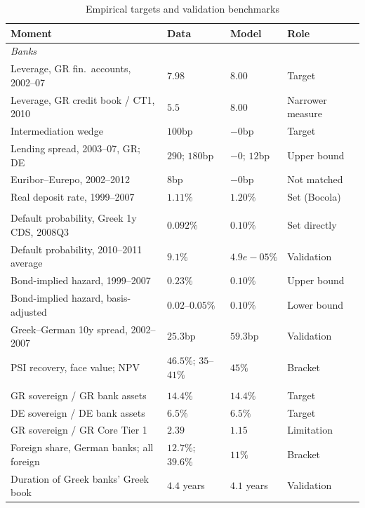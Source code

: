 \begin{table}[H]
  \centering
  \caption{Empirical targets and validation benchmarks}
  \label{tab:targets}
  \footnotesize{}
  \begin{tabular}{llll}
    \toprule
    Moment & Data & Model & Role \\
    \midrule
    \multicolumn{4}{l}{\emph{Banks}} \\
    Leverage, GR fin.\ accounts, 2002--07 & $7.98$ & $8.00$ & Target \\
    Leverage, GR credit book / CT1, 2010 & $5.5$ & $8.00$ & Narrower measure \\
    Intermediation wedge & $100$bp & $-0$bp & Target \\
    Lending spread, 2003--07, GR; DE & $290$; $180$bp & $-0$; $12$bp & Upper bound \\
    Euribor--Eurepo, 2002--2012 & $8$bp & $-0$bp & Not matched \\
    Real deposit rate, 1999--2007 & $1.11\%$ & $1.20\%$ & Set (Bocola) \\
    \addlinespace
    \multicolumn{4}{l}{\emph{Sovereign risk and recovery}} \\
    Default probability, Greek 1y CDS, 2008Q3 & $0.092\%$ & $0.10\%$ & Set directly \\
    Default probability, 2010--2011 average & $9.1\%$ & $4.9e-05\%$ & Validation \\
    Bond-implied hazard, 1999--2007 & $0.23\%$ & $0.10\%$ & Upper bound \\
    Bond-implied hazard, basis-adjusted & $0.02$--$0.05\%$ & $0.10\%$ & Lower bound \\
    Greek--German 10y spread, 2002--2007 & $25.3$bp & $59.3$bp & Validation \\
    PSI recovery, face value; NPV & $46.5\%$; $35$--$41\%$ & $45\%$ & Bracket \\
    \addlinespace
    \multicolumn{4}{l}{\emph{Sovereign exposure}} \\
    GR sovereign / GR bank assets & $14.4\%$ & $14.4\%$ & Target \\
    DE sovereign / DE bank assets & $6.5\%$ & $6.5\%$ & Target \\
    GR sovereign / GR Core Tier 1 & $2.39$ & $1.15$ & Limitation \\
    Foreign share, German banks; all foreign & $12.7\%$; $39.6\%$ & $11\%$ & Bracket \\
    Duration of Greek banks' Greek book & $4.4$ years & $4.1$ years & Validation \\

\end{tabular}
\end{table}
